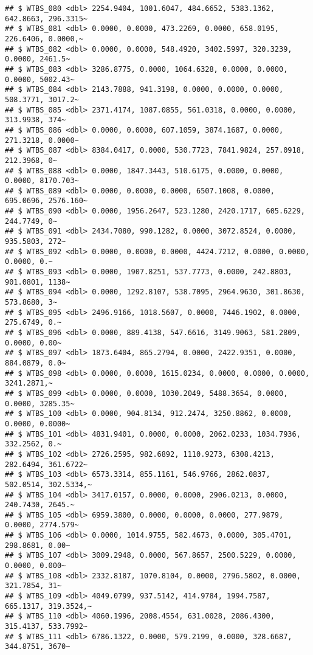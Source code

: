 \documentclass[
]{article}
\begin{document}
\begin{verbatim}
## $ WTBS_080 <dbl> 2254.9404, 1001.6047, 484.6652, 5383.1362, 642.8663, 296.3315~
## $ WTBS_081 <dbl> 0.0000, 0.0000, 473.2269, 0.0000, 658.0195, 226.6406, 0.0000,~
## $ WTBS_082 <dbl> 0.0000, 0.0000, 548.4920, 3402.5997, 320.3239, 0.0000, 2461.5~
## $ WTBS_083 <dbl> 3286.8775, 0.0000, 1064.6328, 0.0000, 0.0000, 0.0000, 5002.43~
## $ WTBS_084 <dbl> 2143.7888, 941.3198, 0.0000, 0.0000, 0.0000, 508.3771, 3017.2~
## $ WTBS_085 <dbl> 2371.4174, 1087.0855, 561.0318, 0.0000, 0.0000, 313.9938, 374~
## $ WTBS_086 <dbl> 0.0000, 0.0000, 607.1059, 3874.1687, 0.0000, 271.3218, 0.0000~
## $ WTBS_087 <dbl> 8384.0417, 0.0000, 530.7723, 7841.9824, 257.0918, 212.3968, 0~
## $ WTBS_088 <dbl> 0.0000, 1847.3443, 510.6175, 0.0000, 0.0000, 0.0000, 8170.703~
## $ WTBS_089 <dbl> 0.0000, 0.0000, 0.0000, 6507.1008, 0.0000, 695.0696, 2576.160~
## $ WTBS_090 <dbl> 0.0000, 1956.2647, 523.1280, 2420.1717, 605.6229, 244.7749, 0~
## $ WTBS_091 <dbl> 2434.7080, 990.1282, 0.0000, 3072.8524, 0.0000, 935.5803, 272~
## $ WTBS_092 <dbl> 0.0000, 0.0000, 0.0000, 4424.7212, 0.0000, 0.0000, 0.0000, 0.~
## $ WTBS_093 <dbl> 0.0000, 1907.8251, 537.7773, 0.0000, 242.8803, 901.0801, 1138~
## $ WTBS_094 <dbl> 0.0000, 1292.8107, 538.7095, 2964.9630, 301.8630, 573.8680, 3~
## $ WTBS_095 <dbl> 2496.9166, 1018.5607, 0.0000, 7446.1902, 0.0000, 275.6749, 0.~
## $ WTBS_096 <dbl> 0.0000, 889.4138, 547.6616, 3149.9063, 581.2809, 0.0000, 0.00~
## $ WTBS_097 <dbl> 1873.6404, 865.2794, 0.0000, 2422.9351, 0.0000, 884.0879, 0.0~
## $ WTBS_098 <dbl> 0.0000, 0.0000, 1615.0234, 0.0000, 0.0000, 0.0000, 3241.2871,~
## $ WTBS_099 <dbl> 0.0000, 0.0000, 1030.2049, 5488.3654, 0.0000, 0.0000, 3285.35~
## $ WTBS_100 <dbl> 0.0000, 904.8134, 912.2474, 3250.8862, 0.0000, 0.0000, 0.0000~
## $ WTBS_101 <dbl> 4831.9401, 0.0000, 0.0000, 2062.0233, 1034.7936, 332.2562, 0.~
## $ WTBS_102 <dbl> 2726.2595, 982.6892, 1110.9273, 6308.4213, 282.6494, 361.6722~
## $ WTBS_103 <dbl> 6573.3314, 855.1161, 546.9766, 2862.0837, 502.0514, 302.5334,~
## $ WTBS_104 <dbl> 3417.0157, 0.0000, 0.0000, 2906.0213, 0.0000, 240.7430, 2645.~
## $ WTBS_105 <dbl> 6959.3800, 0.0000, 0.0000, 0.0000, 277.9879, 0.0000, 2774.579~
## $ WTBS_106 <dbl> 0.0000, 1014.9755, 582.4673, 0.0000, 305.4701, 298.8681, 0.00~
## $ WTBS_107 <dbl> 3009.2948, 0.0000, 567.8657, 2500.5229, 0.0000, 0.0000, 0.000~
## $ WTBS_108 <dbl> 2332.8187, 1070.8104, 0.0000, 2796.5802, 0.0000, 321.7854, 31~
## $ WTBS_109 <dbl> 4049.0799, 937.5142, 414.9784, 1994.7587, 665.1317, 319.3524,~
## $ WTBS_110 <dbl> 4060.1996, 2008.4554, 631.0028, 2086.4300, 315.4137, 533.7992~
## $ WTBS_111 <dbl> 6786.1322, 0.0000, 579.2199, 0.0000, 328.6687, 344.8751, 3670~

\end{verbatim}
\end{document}
